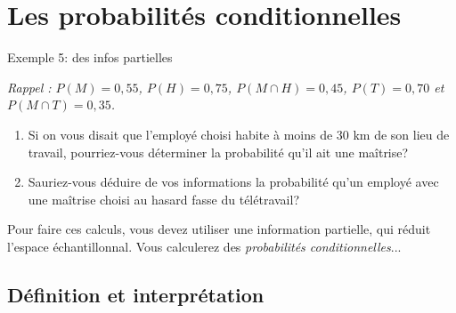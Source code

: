 \documentclass{BeamerTemplate}
\begin{document}
\section[Prob. conditionnelles]{Les probabilités conditionnelles}
\begin{frame}[t]{Exemple 5: des infos partielles}

\small\textit{Rappel : $P(M)=0,55$, $P(H)=0,75$, $P(M\cap H)=0,45$, $P(T)=0,70$ et $P(M\cap T)=0,35$.}\normalsize

\begin{enumerate}
\item Si on vous disait que l'employé choisi habite à moins de 30 km de son lieu de travail, pourriez-vous déterminer la probabilité qu'il ait une maîtrise?

\vspace{1.3cm}

\item Sauriez-vous déduire de vos informations la probabilité qu'un employé avec une maîtrise choisi au hasard fasse du télétravail?

\vspace{1.3cm}
\end{enumerate}

Pour faire ces calculs, vous devez utiliser une information partielle, qui réduit l'espace échantillonnal. Vous calculerez des {\it probabilités conditionnelles}...

\end{frame}



\subsection{Définition et interprétation}
\end{document}

